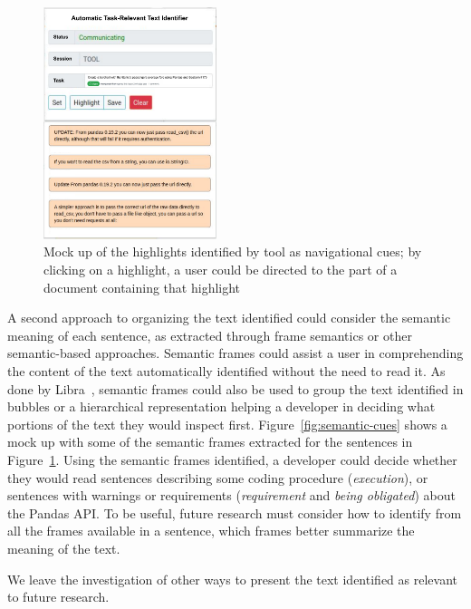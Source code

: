 \begin{figure}
    \centering
    \includegraphics[width=0.45\textwidth]{fig/cp7/navigational-cues}
    \caption{Mock up of the highlights identified by \acs{tool} as navigational cues; by clicking on a highlight, a user could be directed to the part of a document containing that highlight}
    \label{fig:navigational-cues}
\end{figure}



A second approach to organizing the text identified could consider 
the semantic meaning of each sentence, as extracted through frame semantics or other semantic-based approaches. 
Semantic frames could 
assist a user in comprehending the content of the text automatically identified
without the need to read it. 
As done by Libra~\cite{Ponzanelli2017}, semantic frames could also be used to group the text identified in bubbles or a hierarchical representation 
 helping a developer
in deciding what portions of the text they would inspect first. 
Figure~\ref{fig:semantic-cues} shows a mock up 
with some of the semantic frames extracted 
for the sentences in Figure~\ref{fig:navigational-cues}.
Using the semantic frames identified,
a developer could decide whether they would read sentences 
describing some coding procedure (\textit{execution}), or sentences 
with warnings or requirements (\textit{requirement} and \textit{being obligated})
about the Pandas API. 
To be useful, future research must consider how to identify from all the frames available in a sentence, 
which frames
better summarize the meaning of the text. 


We leave the investigation of other ways to present the text identified as relevant to future research.




